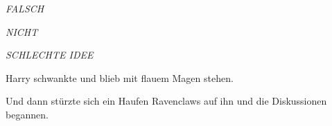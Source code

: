 \emph{FALSCH}

\emph{NICHT}

\emph{SCHLECHTE IDEE}

Harry schwankte und blieb mit flauem Magen stehen.

Und dann stürzte sich ein Haufen Ravenclaws auf ihn und die Diskussionen begannen.


